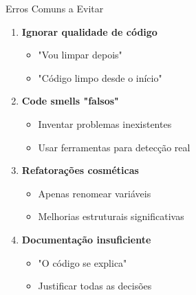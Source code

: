 \documentclass[10pt]{beamer}
\begin{document}
\begin{frame}{Erros Comuns a Evitar}
\begin{enumerate}
    \item \textbf{Ignorar qualidade de código}
    \begin{itemize}
        \item[\ding{55}] "Vou limpar depois"
        \item[\checkmark] "Código limpo desde o início"
    \end{itemize}
    
    \item \textbf{Code smells "falsos"}
    \begin{itemize}
        \item[\ding{55}] Inventar problemas inexistentes
        \item[\checkmark] Usar ferramentas para detecção real
    \end{itemize}
    
    \item \textbf{Refatorações cosméticas}
    \begin{itemize}
        \item[\ding{55}] Apenas renomear variáveis
        \item[\checkmark] Melhorias estruturais significativas
    \end{itemize}
    
    \item \textbf{Documentação insuficiente}
    \begin{itemize}
        \item[\ding{55}] "O código se explica"
        \item[\checkmark] Justificar todas as decisões
    \end{itemize}
\end{enumerate}
\end{frame}
\end{document}
